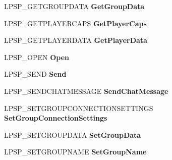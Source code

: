 \begin{DoxyCompactItemize}
\item 
\mbox{\label{struct_s_p___c_a_l_l_b_a_c_k_s_ac051141aede0684bcedd32d6990bf381}} 
L\+P\+S\+P\+\_\+\+G\+E\+T\+G\+R\+O\+U\+P\+D\+A\+TA {\bfseries Get\+Group\+Data}
\item 
\mbox{\label{struct_s_p___c_a_l_l_b_a_c_k_s_a1b6d5635253bed097046245337b2ff6b}} 
L\+P\+S\+P\+\_\+\+G\+E\+T\+P\+L\+A\+Y\+E\+R\+C\+A\+PS {\bfseries Get\+Player\+Caps}
\item 
\mbox{\label{struct_s_p___c_a_l_l_b_a_c_k_s_a855bd0d4a4cf15d285583cc6872705b9}} 
L\+P\+S\+P\+\_\+\+G\+E\+T\+P\+L\+A\+Y\+E\+R\+D\+A\+TA {\bfseries Get\+Player\+Data}
\item 
\mbox{\label{struct_s_p___c_a_l_l_b_a_c_k_s_a26ec0d9fa089c7c9cf2ee76717e70406}} 
L\+P\+S\+P\+\_\+\+O\+P\+EN {\bfseries Open}
\item 
\mbox{\label{struct_s_p___c_a_l_l_b_a_c_k_s_aac26e264664b5f39f28f5d8036cb5535}} 
L\+P\+S\+P\+\_\+\+S\+E\+ND {\bfseries Send}
\item 
\mbox{\label{struct_s_p___c_a_l_l_b_a_c_k_s_abdb967627c9aeb1250864d5bbf7a1afa}} 
L\+P\+S\+P\+\_\+\+S\+E\+N\+D\+C\+H\+A\+T\+M\+E\+S\+S\+A\+GE {\bfseries Send\+Chat\+Message}
\item 
\mbox{\label{struct_s_p___c_a_l_l_b_a_c_k_s_a4060d47e33e72b9fba985f26750f66a0}} 
L\+P\+S\+P\+\_\+\+S\+E\+T\+G\+R\+O\+U\+P\+C\+O\+N\+N\+E\+C\+T\+I\+O\+N\+S\+E\+T\+T\+I\+N\+GS {\bfseries Set\+Group\+Connection\+Settings}
\item 
\mbox{\label{struct_s_p___c_a_l_l_b_a_c_k_s_a39a402b24dd910d865c913f5fd716f88}} 
L\+P\+S\+P\+\_\+\+S\+E\+T\+G\+R\+O\+U\+P\+D\+A\+TA {\bfseries Set\+Group\+Data}
\item 
\mbox{\label{struct_s_p___c_a_l_l_b_a_c_k_s_afa1e2b72dc68a24ed2bc122c4e13feab}} 
L\+P\+S\+P\+\_\+\+S\+E\+T\+G\+R\+O\+U\+P\+N\+A\+ME {\bfseries Set\+Group\+Name}
\item 

\end{DoxyCompactItemize}
